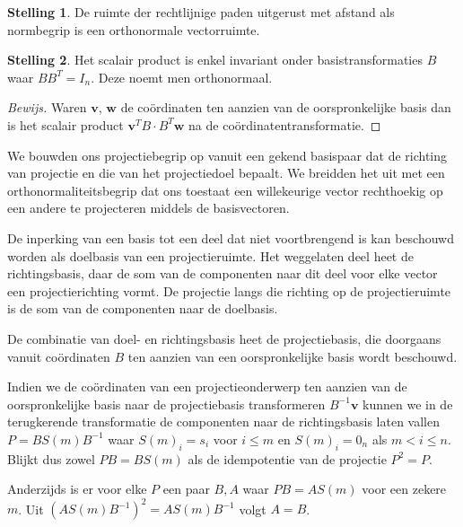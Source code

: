 \documentclass{amsart}
\theoremstyle{definition}
\newtheorem{thm}{Stelling}[section]
\newenvironment{bewijs}{\begin{proof}[Bewijs]}{\end{proof}}
\newcommand{\vvec}[1][v]{\mathbf{#1}}
\begin{document}
\begin{thm}
	De ruimte der rechtlijnige paden uitgerust met afstand als normbegrip is een orthonormale vectorruimte.
\end{thm}

\begin{thm}
	Het scalair product is enkel invariant onder basistransformaties $B$ waar $BB^T=I_n$. Deze noemt men orthonormaal.
	\begin{bewijs}
		Waren $\vvec$, $\vvec[w]$ de coördinaten ten aanzien van de oorspronkelijke basis dan is het scalair product $\vvec^T B\cdot B^T\vvec[w]$ na de coördinatentransformatie.
	\end{bewijs}
\end{thm}

We bouwden ons projectiebegrip op vanuit een gekend basispaar dat de richting van projectie en die van het projectiedoel bepaalt.
We breidden het uit met een orthonormaliteitsbegrip dat ons toestaat een willekeurige vector rechthoekig op een andere te projecteren middels de basisvectoren.

De inperking van een basis tot een deel dat niet voortbrengend is kan beschouwd worden als doelbasis van een projectieruimte.
Het weggelaten deel heet de richtingsbasis, daar de som van de componenten naar dit deel voor elke vector een projectierichting vormt.
De projectie langs die richting op de projectieruimte is de som van de componenten naar de doelbasis.

De combinatie van doel- en richtingsbasis heet de projectiebasis, die doorgaans vanuit coördinaten $B$ ten aanzien van een oorspronkelijke basis wordt beschouwd.

Indien we de coördinaten van een projectieonderwerp ten aanzien van de oorspronkelijke basis naar de projectiebasis transformeren $B^{-1}\vvec$ kunnen we in de terugkerende transformatie de componenten naar de richtingsbasis laten vallen $P = BS(m)B^{-1}$ waar $S(m)_i = s_i$ voor $i\leq m$ en $S(m)_i = 0_n$ als $m<i\leq n$.
Blijkt dus zowel $PB = BS(m)$ als de idempotentie van de projectie $P^2=P$.

Anderzijds is er voor elke $P$ een paar $B, A$ waar $PB = AS(m)$ voor een zekere $m$. Uit ${(AS(m)B^{-1})}^2 = AS(m)B^{-1}$ volgt $A = B$.

\newpage
\end{document}
